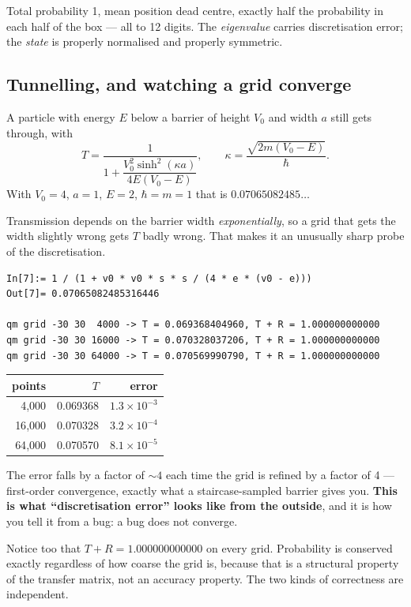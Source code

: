\documentclass[11pt]{article}
\begin{document}
Total probability 1, mean position dead centre, exactly half the
probability in each half of the box --- all to 12 digits. The
\emph{eigenvalue} carries discretisation error; the \emph{state} is
properly normalised and properly symmetric.

\subsection{Tunnelling, and watching a grid converge}

A particle with energy $E$ below a barrier of height $V_0$ and width $a$
still gets through, with
\[
T = \frac{1}{1 + \dfrac{V_0^2\sinh^2(\kappa a)}{4E(V_0-E)}},
\qquad \kappa = \frac{\sqrt{2m(V_0-E)}}{\hbar}.
\]
With $V_0=4$, $a=1$, $E=2$, $\hbar=m=1$ that is $0.07065082485\ldots$

Transmission depends on the barrier width \emph{exponentially}, so a
grid that gets the width slightly wrong gets $T$ badly wrong. That makes
it an unusually sharp probe of the discretisation.

\begin{lstlisting}
In[7]:= 1 / (1 + v0 * v0 * s * s / (4 * e * (v0 - e)))
Out[7]= 0.07065082485316446

qm grid -30 30  4000 -> T = 0.069368404960, T + R = 1.000000000000
qm grid -30 30 16000 -> T = 0.070328037206, T + R = 1.000000000000
qm grid -30 30 64000 -> T = 0.070569990790, T + R = 1.000000000000
\end{lstlisting}

\begin{center}
\begin{tabular}{rrr}
\textbf{points} & \textbf{$T$} & \textbf{error}\\\hline
4{,}000  & 0.069368 & $1.3\times10^{-3}$\\
16{,}000 & 0.070328 & $3.2\times10^{-4}$\\
64{,}000 & 0.070570 & $8.1\times10^{-5}$\\
\end{tabular}
\end{center}

The error falls by a factor of $\sim4$ each time the grid is refined by
a factor of 4 --- first-order convergence, exactly what a
staircase-sampled barrier gives you. \textbf{This is what
``discretisation error'' looks like from the outside}, and it is how you
tell it from a bug: a bug does not converge.

Notice too that $T + R = 1.000000000000$ on every grid. Probability is
conserved exactly regardless of how coarse the grid is, because that is
a structural property of the transfer matrix, not an accuracy property.
The two kinds of correctness are independent.
\end{document}
